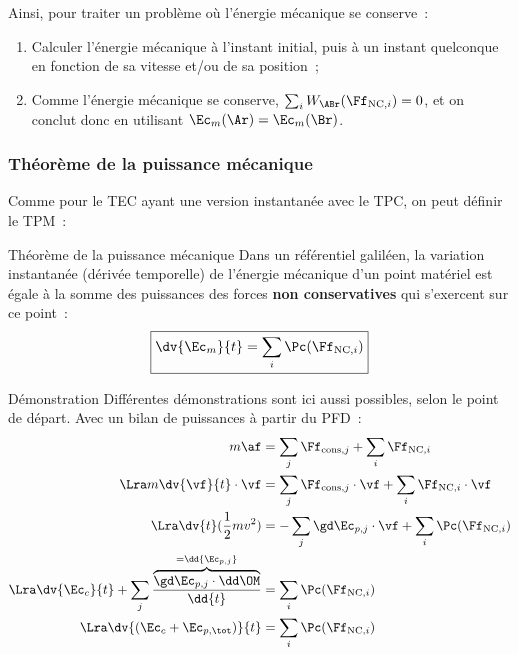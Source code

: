 \documentclass[../main/main.tex]{subfiles}
\begin{document}
Ainsi, pour traiter un problème où l'énergie mécanique se conserve~:
\begin{enumerate}
    \item Calculer l'énergie mécanique à l'instant initial, puis à un instant
        quelconque en fonction de sa vitesse et/ou de sa position~;
    \item Comme l'énergie mécanique se conserve, $\sum_i W_{\ABr}(\Ff_{{\rm
        NC},i}) = 0$, et on conclut donc en utilisant $\Ec_m(\Ar) = \Ec_m(\Br)$.
\end{enumerate}

\subsubsection{Théorème de la puissance mécanique}

Comme pour le TEC ayant une version instantanée avec le TPC, on peut définir le
TPM~:

\begin{tprop}{Théorème de la puissance mécanique}
    Dans un référentiel galiléen, la variation instantanée (dérivée temporelle)
    de l’énergie mécanique d’un point matériel est égale à la somme des
    puissances des forces \textbf{non conservatives} qui s’exercent sur ce
    point~:
    \[\boxed{\dv{\Ec_m}{t} = \sum_i \Pc(\Ff_{{\rm NC},i})}\]
\end{tprop}

\begin{rdemo}{Démonstration}
    Différentes démonstrations sont ici aussi possibles, selon le point de
    départ. Avec un bilan de puissances à partir du PFD~:
    \begin{align*}
        m\af &= \sum_j \Ff_{{\rm cons},j} + \sum_i \Ff_{{\rm NC},i} 
        \\\Lra
        m \dv{\vf}{t}\cdot\vf &= \sum_j \Ff_{{\rm cons},j}\cdot\vf
            + \sum_i \Ff_{{\rm NC},i}\cdot\vf
        \\\Lra
        \dv{t}( \frac{1}{2}mv^2) &= -\sum_j \gd\Ec_{p,j}\cdot\vf
            + \sum_i \Pc(\Ff_{{\rm NC},i})
        \\\Lra
        \dv{\Ec_c}{t} + \sum_j
        \frac{\overbrace{\gd\Ec_{p,j}\cdot\dd\OM}^{=\dd{\Ec_{p,j}}}}{\dd{t}}
            &= \sum_i \Pc(\Ff_{{\rm NC},i})
        \\\Lra
        \dv{(\Ec_c + \Ec_{p,\tot})}{t}
            &= \sum_i \Pc(\Ff_{{\rm NC},i})
    \end{align*}
\end{rdemo}
\end{document}
